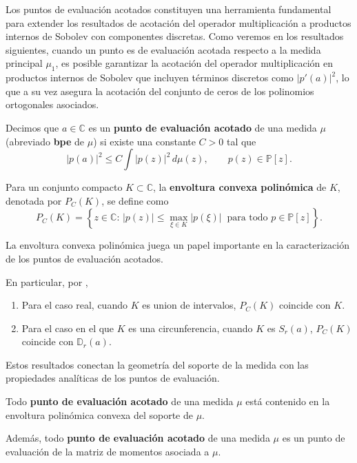 Los puntos de evaluación acotados constituyen una herramienta fundamental para extender los resultados de acotación del operador multiplicación a productos internos de Sobolev con componentes discretas. Como veremos en los resultados siguientes, cuando un punto es de evaluación acotada respecto a la medida principal $\mu_1$, es posible garantizar la acotación del operador multiplicación en productos internos de Sobolev que incluyen términos discretos como $|p'(a)|^2$, lo que a su vez asegura la acotación del conjunto de ceros de los polinomios ortogonales asociados.

\begin{definition}\label{def:bounded_eval_point}
	\cite{escribano2025zeros}
	Decimos que \(a\in\mathbb{C}\) es un \textbf{punto de evaluación acotado} de una medida \(\mu\) (abreviado \textbf{bpe} de \(\mu\)) si existe una constante \(C>0\) tal que
	\[
		|p(a)|^{2} \leq C \int |p(z)|^{2}\,d\mu(z), \qquad p(z)\in\mathbb{P}[z].
	\]
\end{definition}

\begin{definition}\label{def:poly_convex_hull}
	\cite{escribano2025zeros}
	Para un conjunto compacto \(K \subset \mathbb{C}\), la \textbf{envoltura convexa polinómica} de \(K\), denotada por \(P_C(K)\), se define como
	\[
		P_C(K) =
		\left\{ z \in \mathbb{C} :\, |p(z)| \leq \max_{\xi\in K}|p(\xi)|\ \text{ para todo } p\in\mathbb{P}[z] \right\}.
	\]
\end{definition}

La envoltura convexa polinómica juega un papel importante en la caracterización de los puntos de evaluación acotados.

En particular, por \cite{Conway1978}, \cite{Gamelin1969}
\begin{enumerate}
	\item Para el caso real, cuando $K$ es union de intervalos, $P_C(K)$ coincide con $K$.
	\item Para el caso en el que $K$ es una circunferencia, cuando $K$ es $S_{r}(a)$, $P_C(K)$ coincide con $\mathbb{D}_{r}(a)$.
\end{enumerate}

Estos resultados conectan la geometría del soporte de la medida con las propiedades analíticas de los puntos de evaluación.

\begin{lemma}\label{lem:bounded_eval_point_in_hull}
	\cite{escribano2025zeros} Todo \textbf{punto de evaluación acotado} de una medida $\mu$ está contenido en la envoltura polinómica convexa del soporte de $\mu$.

	\noindent Además, todo \textbf{punto de evaluación acotado} de una medida $\mu$ es un punto de evaluación de la matriz de momentos asociada a $\mu$.
\end{lemma}

